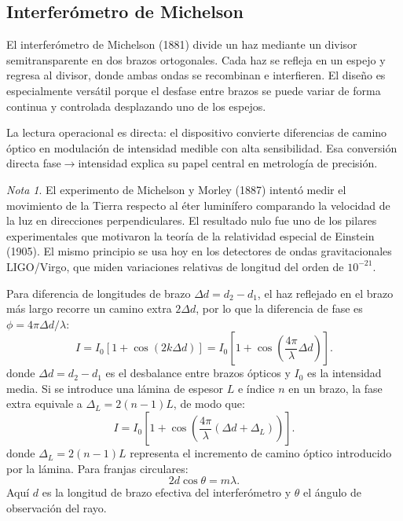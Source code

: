 \documentclass[12pt, a4paper]{article}
\theoremstyle{plain}
\theoremstyle{definition}
\theoremstyle{remark}
\newtheorem*{nota}{Nota}
\begin{document}
\subsection{Interferómetro de Michelson}

El interferómetro de Michelson (1881) divide un haz mediante un
divisor semitransparente en dos brazos ortogonales. Cada haz se refleja
en un espejo y regresa al divisor, donde ambas ondas se recombinan e
interfieren. El diseño es especialmente versátil porque el desfase entre
brazos se puede variar de forma continua y controlada desplazando uno de
los espejos.

La lectura operacional es directa: el dispositivo convierte diferencias de
camino óptico en modulación de intensidad medible con alta sensibilidad.
Esa conversión directa fase$\to$intensidad explica su papel central en
metrología de precisión.

\begin{nota}
El experimento de Michelson y Morley (1887) intentó medir el movimiento
de la Tierra respecto al éter luminífero comparando la velocidad de la
luz en direcciones perpendiculares. El resultado nulo fue uno de los
pilares experimentales que motivaron la teoría de la relatividad especial
de Einstein (1905). El mismo principio se usa hoy en los detectores de
ondas gravitacionales LIGO/Virgo, que miden variaciones relativas de
longitud del orden de $10^{-21}$.
\end{nota}

Para diferencia de longitudes de brazo $\Delta d=d_2-d_1$, el haz
reflejado en el brazo más largo recorre un camino extra $2\Delta d$,
por lo que la diferencia de fase es $\phi = 4\pi\Delta d/\lambda$:
\begin{equation}
  I=I_0\left[1+\cos\!\left(2k\Delta d\right)\right]
  =I_0\left[1+\cos\!\left(\frac{4\pi}{\lambda}\Delta d\right)\right].
  \label{eq:michelson_int_t6}
\end{equation}
donde $\Delta d=d_2-d_1$ es el desbalance entre brazos ópticos y
$I_0$ es la intensidad media.
Si se introduce una lámina de espesor $L$ e índice $n$ en un brazo, la fase
extra equivale a $\Delta_{\!L}=2(n-1)L$, de modo que:
\begin{equation}
  I=I_0\left[1+\cos\!\left(\frac{4\pi}{\lambda}(\Delta d+\Delta_{\!L})\right)\right].
  \label{eq:michelson_lamina_t6}
\end{equation}
donde $\Delta_{\!L}=2(n-1)L$ representa el incremento de camino óptico
introducido por la lámina.
Para franjas circulares:
\begin{equation}
  2d\cos\theta=m\lambda.
  \label{eq:michelson_anillos_t6}
\end{equation}
Aquí $d$ es la longitud de brazo efectiva del interferómetro y $\theta$ el
ángulo de observación del rayo.
\end{document}

